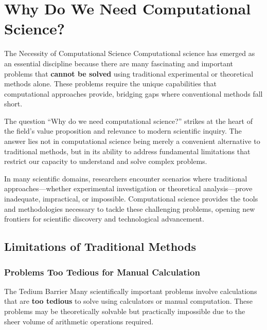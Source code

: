 \section{Why Do We Need Computational Science?}

\begin{conceptcard}{The Necessity of Computational Science}
Computational science has emerged as an essential discipline because there are many fascinating and important problems that \textbf{cannot be solved} using traditional experimental or theoretical methods alone. These problems require the unique capabilities that computational approaches provide, bridging gaps where conventional methods fall short.
\end{conceptcard}

The question ``Why do we need computational science?'' strikes at the heart of the field's value proposition and relevance to modern scientific inquiry. The answer lies not in computational science being merely a convenient alternative to traditional methods, but in its ability to address fundamental limitations that restrict our capacity to understand and solve complex problems.

In many scientific domains, researchers encounter scenarios where traditional approaches—whether experimental investigation or theoretical analysis—prove inadequate, impractical, or impossible. Computational science provides the tools and methodologies necessary to tackle these challenging problems, opening new frontiers for scientific discovery and technological advancement.

\subsection{Limitations of Traditional Methods}

\subsubsection{Problems Too Tedious for Manual Calculation}

\begin{warningbox}{The Tedium Barrier}
Many scientifically important problems involve calculations that are \textbf{too tedious} to solve using calculators or manual computation. These problems may be theoretically solvable but practically impossible due to the sheer volume of arithmetic operations required.
\end{warningbox}

